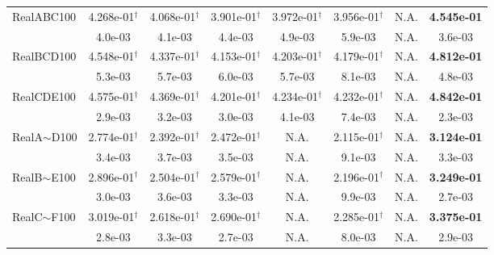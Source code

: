{\begin{longtable}[c]{lccccccc}
    RealABC100      & 4.268e-01$^{\dag}$ & 4.068e-01$^{\dag}$ & 3.901e-01$^{\dag}$ & 3.972e-01$^{\dag}$ & 3.956e-01$^{\dag}$ & N.A.         & \textbf{4.545e-01} \\
               & 4.0e-03            & 4.1e-03            & 4.4e-03            & 4.9e-03            & 5.9e-03            & N.A.                         & 3.6e-03            \\
    \midrule
    RealBCD100      & 4.548e-01$^{\dag}$ & 4.337e-01$^{\dag}$ & 4.153e-01$^{\dag}$ & 4.203e-01$^{\dag}$ & 4.179e-01$^{\dag}$ & N.A.                & \textbf{4.812e-01} \\
              & 5.3e-03            & 5.7e-03            & 6.0e-03            & 5.7e-03            & 8.1e-03            & N.A.                       & 4.8e-03            \\
    \midrule
    RealCDE100      & 4.575e-01$^{\dag}$ & 4.369e-01$^{\dag}$ & 4.201e-01$^{\dag}$ & 4.234e-01$^{\dag}$ & 4.232e-01$^{\dag}$ & N.A.                  & \textbf{4.842e-01} \\
             & 2.9e-03            & 3.2e-03            & 3.0e-03            & 4.1e-03            & 7.4e-03            & N.A.                          & 2.3e-03            \\
    \midrule
    RealA$\sim$D100      & 2.774e-01$^{\dag}$ & 2.392e-01$^{\dag}$ & 2.472e-01$^{\dag}$ & N.A.               & 2.115e-01$^{\dag}$ & N.A.              & \textbf{3.124e-01} \\
           & 3.4e-03            & 3.7e-03            & 3.5e-03            & N.A.               & 9.1e-03            & N.A.                          & 3.3e-03            \\
    \midrule
    RealB$\sim$E100      & 2.896e-01$^{\dag}$ & 2.504e-01$^{\dag}$ & 2.579e-01$^{\dag}$ & N.A.               & 2.196e-01$^{\dag}$ & N.A.                 & \textbf{3.249e-01} \\
            & 3.0e-03            & 3.6e-03            & 3.3e-03            & N.A.               & 9.9e-03            & N.A.                          & 2.7e-03            \\
    \midrule
    RealC$\sim$F100      & 3.019e-01$^{\dag}$ & 2.618e-01$^{\dag}$ & 2.690e-01$^{\dag}$ & N.A.               & 2.285e-01$^{\dag}$ & N.A.                 & \textbf{3.375e-01} \\
            & 2.8e-03            & 3.3e-03            & 2.7e-03            & N.A.               & 8.0e-03            & N.A.                         & 2.9e-03            \\

\end{longtable}}
